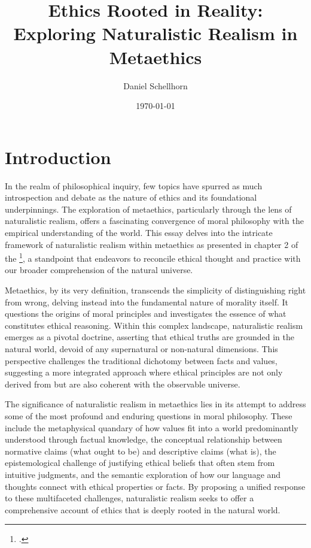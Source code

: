 \documentclass[12pt,a4paper]{article}
\title{Ethics Rooted in Reality: Exploring Naturalistic Realism in Metaethics}
\author{Daniel Schellhorn}
\date{\today}
\begin{document}
\maketitle

\section{Introduction}
In the realm of philosophical inquiry, few topics have spurred as much introspection and debate as the nature of ethics and its foundational underpinnings. The exploration of metaethics, particularly through the lens of naturalistic realism, offers a fascinating convergence of moral philosophy with the empirical understanding of the world. This essay delves into the intricate framework of naturalistic realism within metaethics as presented in chapter 2 of the  \footcite{mcpherson2020metaethics}, a standpoint that endeavors to reconcile ethical thought and practice with our broader comprehension of the natural universe.

Metaethics, by its very definition, transcends the simplicity of distinguishing right from wrong, delving instead into the fundamental nature of morality itself. It questions the origins of moral principles and investigates the essence of what constitutes ethical reasoning. Within this complex landscape, naturalistic realism emerges as a pivotal doctrine, asserting that ethical truths are grounded in the natural world, devoid of any supernatural or non-natural dimensions. This perspective challenges the traditional dichotomy between facts and values, suggesting a more integrated approach where ethical principles are not only derived from but are also coherent with the observable universe.

The significance of naturalistic realism in metaethics lies in its attempt to address some of the most profound and enduring questions in moral philosophy. These include the metaphysical quandary of how values fit into a world predominantly understood through factual knowledge, the conceptual relationship between normative claims (what ought to be) and descriptive claims (what is), the epistemological challenge of justifying ethical beliefs that often stem from intuitive judgments, and the semantic exploration of how our language and thoughts connect with ethical properties or facts. By proposing a unified response to these multifaceted challenges, naturalistic realism seeks to offer a comprehensive account of ethics that is deeply rooted in the natural world.
\end{document}
